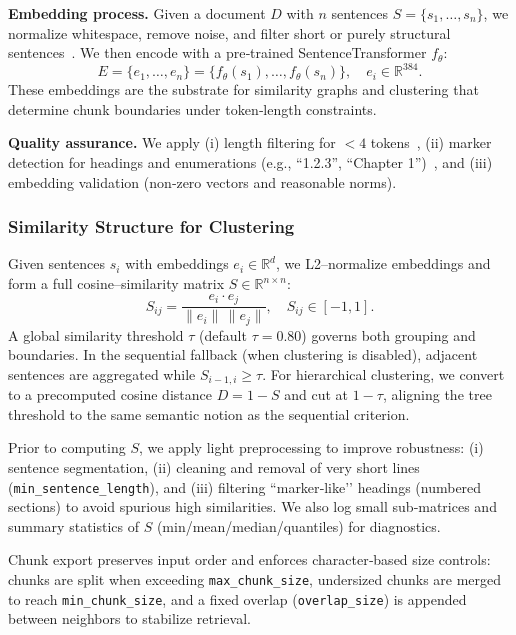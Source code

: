 \documentclass[10pt,twocolumn,letterpaper]{article}
\begin{document}
\vspace{0.5em}
\textbf{Embedding process.}
Given a document $D$ with $n$ sentences $S=\{s_1,\dots,s_n\}$, we normalize whitespace, remove noise, and filter short or purely structural sentences~\cite{johnson2023rule}. We then encode with a pre‑trained SentenceTransformer $f_\theta$:
\begin{equation}
E=\{e_1,\dots,e_n\}=\{f_\theta(s_1),\dots,f_\theta(s_n)\},\quad e_i\in\mathbb{R}^{384}.
\end{equation}
These embeddings are the substrate for similarity graphs and clustering that determine chunk boundaries under token‑length constraints.

\vspace{0.5em}
\textbf{Quality assurance.}
We apply (i) length filtering for $<4$ tokens~\cite{smith2023fixed}, (ii) marker detection for headings and enumerations (e.g., ``1.2.3'', ``Chapter 1'')~\cite{johnson2023rule}, and (iii) embedding validation (non‑zero vectors and reasonable norms). 

\subsubsection{Similarity Structure for Clustering}

Given sentences $s_i$ with embeddings $e_i\in\mathbb{R}^d$, we L2–normalize embeddings and form a full cosine–similarity matrix $S\in\mathbb{R}^{n\times n}$:
\[
S_{ij}=\frac{e_i\cdot e_j}{\lVert e_i\rVert\,\lVert e_j\rVert},\quad S_{ij}\in[-1,1].
\]
A global similarity threshold $\tau$ (default $\tau\!=\!0.80$) governs both grouping and boundaries. In the sequential fallback (when clustering is disabled), adjacent sentences are aggregated while $S_{i-1,i}\!\ge\!\tau$. For hierarchical clustering, we convert to a precomputed cosine distance $D=1{-}S$ and cut at $1{-}\tau$, aligning the tree threshold to the same semantic notion as the sequential criterion.

\vspace{0.5em}
Prior to computing $S$, we apply light preprocessing to improve robustness: (i) sentence segmentation, (ii) cleaning and removal of very short lines (\texttt{min\_sentence\_length}), and (iii) filtering “marker‑like’’ headings (numbered sections) to avoid spurious high similarities. We also log small sub‑matrices and summary statistics of $S$ (min/mean/median/quantiles) for diagnostics.

\vspace{0.5em}
Chunk export preserves input order and enforces character‑based size controls: chunks are split when exceeding \texttt{max\_chunk\_size}, undersized chunks are merged to reach \texttt{min\_chunk\_size}, and a fixed overlap (\texttt{overlap\_size}) is appended between neighbors to stabilize retrieval.
\end{document}
